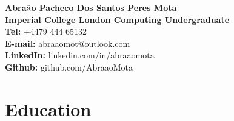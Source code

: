 \documentclass[a4paper,10pt]{article}
\begin{document}
	
	\begin{center}
		{\LARGE\bfseries Abra\~ao Pacheco Dos Santos Peres Mota} \\
		\vspace{2mm}
		{\large \textbf{Imperial College London Computing Undergraduate} } \vspace{1mm} \\
		{\large \textbf{Tel:} +4479 444 65132} \\ \vspace{1mm}
		{\large \textbf{E-mail:} abraaomot@outlook.com } \\ \vspace{1mm}
		{\large \textbf{LinkedIn:} linkedin.com/in/abraaomota } \\ \vspace{1mm}
		{\large \textbf{Github:} github.com/AbraaoMota } \\
	
	\end{center}
	
	\section*{Education}
	
\end{document}
